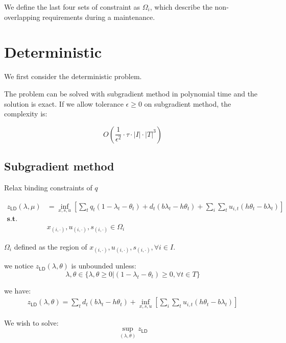 \documentclass[
  a4paper,
,tablecaptionabove
]{scrartcl}
\numberwithin{equation}{section}
\begin{document}
We define the last four sets of constraint as \(\Omega_i\), which
describe the non-overlapping requirements during a maintenance.

\hypertarget{deterministic}{%
  \section{Deterministic}\label{deterministic}}

We first consider the deterministic problem.

The problem can be solved with subgradient method in polynomial time and
the solution is exact. If we allow tolerance \(\epsilon \ge 0\) on
subgradient method, the complexity is:

\[O\left(\frac{1}{\epsilon^2}\cdot\tau\cdot|I|\cdot|T|^3\right)\]

\hypertarget{subgradient-method}{%
  \subsection{Subgradient method}\label{subgradient-method}}

Relax binding constraints of \(q\)

\[\begin{aligned}
    z_{\mathsf{LD}}(\lambda, \mu) & = \inf_{x, s, u} \left[ \sum_t
      q_t (1-\lambda_t - \theta_t) + d_t(b\lambda_t -h \theta_t)
    + \sum_i \sum_t u_{i,t}(h\theta_t - b\lambda_t) \right]                                  \\
    \mathbf {s.t. }               &                                                          \\
                                  & x_{(i,\cdot)}, u_{(i,\cdot)}, s_{(i,\cdot)} \in \Omega_i
  \end{aligned}\]

\(\Omega_i\) defined as the region of
\(x_{(i,\cdot)}, u_{(i,\cdot)}, s_{(i,\cdot)}, \forall i\in I\).

we notice \(z_{\mathsf{LD}}(\lambda, \theta)\) is unbounded unless:
\[\lambda, \theta \in \{\lambda, \theta \ge 0 \big | (1-\lambda_t - \theta_t) \ge 0,\forall t\in T\}\]

we have: \[\begin{aligned}
    z_{\mathsf{LD}}(\lambda, \theta) = \sum_t
    d_t(b\lambda_t -h \theta_t) + \inf_{x, s, u} \left[  \sum_i \sum_t u_{i,t}(h\theta_t - b\lambda_t) \right]
  \end{aligned}\]

We wish to solve: \[\sup_{(\lambda, \theta)}z_{\mathsf{LD}}\]
\end{document}
